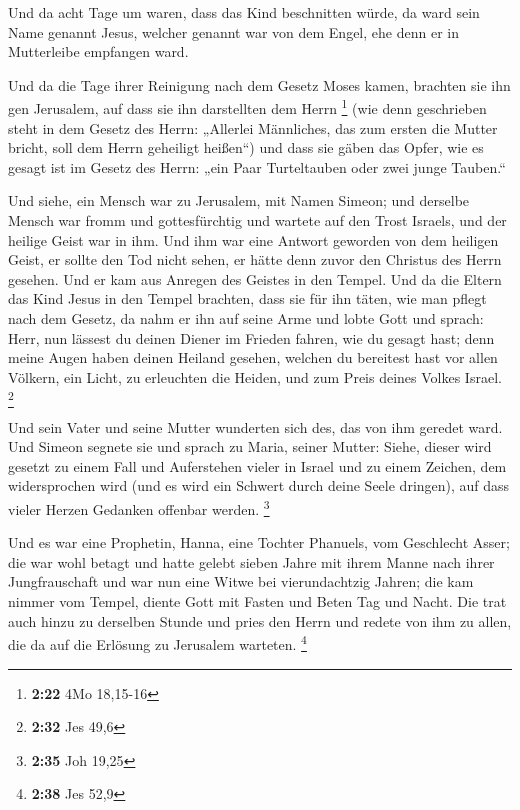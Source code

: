  Und da acht Tage um waren, dass das Kind beschnitten
würde, da ward sein Name genannt Jesus, welcher genannt war von dem
Engel, ehe denn er in Mutterleibe empfangen ward.

 Und da die Tage ihrer Reinigung nach dem Gesetz Moses
kamen, brachten sie ihn gen Jerusalem, auf dass sie ihn darstellten dem
Herrn \footnote{\textbf{2:22} 4Mo 18,15-16}  (wie denn
geschrieben steht in dem Gesetz des Herrn: „Allerlei Männliches, das zum
ersten die Mutter bricht, soll dem Herrn geheiligt heißen``)
 und dass sie gäben das Opfer, wie es gesagt ist im Gesetz
des Herrn: „ein Paar Turteltauben oder zwei junge Tauben.``

 Und siehe, ein Mensch war zu Jerusalem, mit Namen Simeon;
und derselbe Mensch war fromm und gottesfürchtig und wartete auf den
Trost Israels, und der heilige Geist war in ihm.  Und ihm
war eine Antwort geworden von dem heiligen Geist, er sollte den Tod
nicht sehen, er hätte denn zuvor den Christus des Herrn gesehen.
 Und er kam aus Anregen des Geistes in den Tempel. Und da
die Eltern das Kind Jesus in den Tempel brachten, dass sie für ihn
täten, wie man pflegt nach dem Gesetz,  da nahm er ihn auf
seine Arme und lobte Gott und sprach:  Herr, nun lässest du
deinen Diener im Frieden fahren, wie du gesagt hast;  denn
meine Augen haben deinen Heiland gesehen,  welchen du
bereitest hast vor allen Völkern,  ein Licht, zu erleuchten
die Heiden, und zum Preis deines Volkes Israel. \footnote{\textbf{2:32}
  Jes 49,6}

 Und sein Vater und seine Mutter wunderten sich des, das
von ihm geredet ward.  Und Simeon segnete sie und sprach zu
Maria, seiner Mutter: Siehe, dieser wird gesetzt zu einem Fall und
Auferstehen vieler in Israel und zu einem Zeichen, dem widersprochen
wird  (und es wird ein Schwert durch deine Seele dringen),
auf dass vieler Herzen Gedanken offenbar werden. \footnote{\textbf{2:35}
  Joh 19,25}

 Und es war eine Prophetin, Hanna, eine Tochter Phanuels,
vom Geschlecht Asser; die war wohl betagt und hatte gelebt sieben Jahre
mit ihrem Manne nach ihrer Jungfrauschaft  und war nun eine
Witwe bei vierundachtzig Jahren; die kam nimmer vom Tempel, diente Gott
mit Fasten und Beten Tag und Nacht.  Die trat auch hinzu zu
derselben Stunde und pries den Herrn und redete von ihm zu allen, die da
auf die Erlösung zu Jerusalem warteten. \footnote{\textbf{2:38} Jes 52,9}

